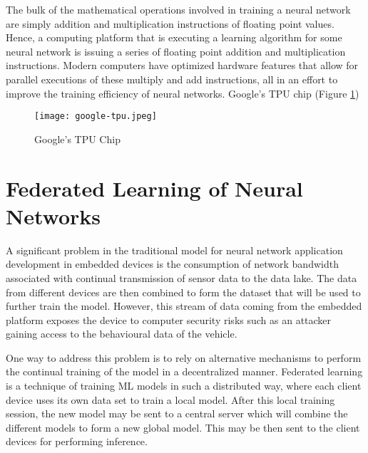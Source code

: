 The bulk of the mathematical operations involved in training a neural network are simply addition and multiplication instructions of floating point values. Hence, a computing platform that is executing a learning algorithm for some neural network is issuing a series of floating point addition and multiplication instructions. Modern computers have optimized hardware features that allow for parallel executions of these multiply and add instructions, all in an effort to improve the training efficiency of neural networks. Google's TPU chip (Figure \ref{fig:google-tpu})

\begin{figure}[h]
	\centering
	\texttt{[image: google-tpu.jpeg]}
	\caption{Google's TPU Chip}
	\label{fig:google-tpu}
\end{figure}

\section{Federated Learning of Neural Networks}

A significant problem in the traditional model for neural network application development in embedded devices is the consumption of network bandwidth associated with continual transmission of sensor data to the data lake. The data from different devices are then combined to form the dataset that will be used to further train the model. However, this stream of data coming from the embedded platform exposes the device to computer security risks such as an attacker gaining access to the behavioural data of the vehicle.

\begin{figure}[h]
	\centering
\end{figure}

One way to address this problem is to rely on alternative mechanisms to perform the continual training of the model in a decentralized manner. Federated learning is a technique of training ML models in such a distributed way, where each client device uses its own data set to train a local model. After this local training session, the new model may be sent to a central server which will combine the different models to form a new global model. This may be then sent to the client devices for performing inference.


